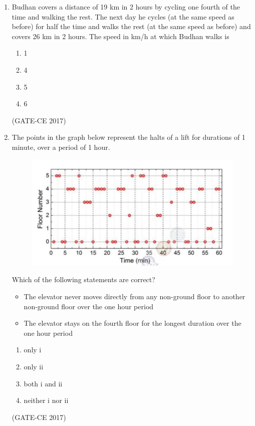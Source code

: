 \documentclass[journal,12pt,onecolumn]{article}
\theoremstyle{remark}
\begin{document}
\begin{enumerate}
    \item Budhan covers a distance of 19 km in 2 hours by cycling one fourth of the time and walking the rest. The next day he cycles (at the same speed as before) for half the time and walks the rest (at the same speed as before) and covers 26 km in 2 hours. The speed in km/h at which Budhan walks is
    \begin{multicols}{4}
    \begin{enumerate}
        \item 1  
        \item 4  
        \item 5  
        \item 6  
    \end{enumerate}
    \end{multicols}
    \hfill (GATE-CE 2017)

    \item The points in the graph  below represent the halts of a lift for durations of 1 minute, over a period of 1 hour.
    \begin{figure}[H]
    \centering
    \includegraphics[width=0.7\columnwidth]{q65.jpg}  
    \caption{}
    \label{fig:14}
    \end{figure}
    Which of the following statements are correct?
    \begin{itemize}
        \item The elevator never moves directly from any non-ground floor to another non-ground floor over the one hour period  
        \item The elevator stays on the fourth floor for the longest duration over the one hour period  
    \end{itemize}
    \begin{multicols}{2}
    \begin{enumerate}
        \item only i
        \item only ii
        \item both i and ii
        \item neither i nor ii
    \end{enumerate}
    \end{multicols}
    \hfill (GATE-CE 2017)

\end{enumerate}
\end{document}
